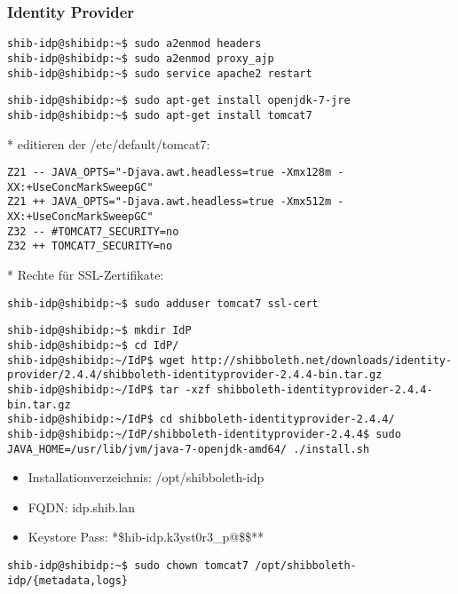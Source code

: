 \subsubsection{Identity Provider}
\begin{lstlisting}
shib-idp@shibidp:~$ sudo a2enmod headers
shib-idp@shibidp:~$ sudo a2enmod proxy_ajp
shib-idp@shibidp:~$ sudo service apache2 restart
\end{lstlisting}
\begin{lstlisting}
shib-idp@shibidp:~$ sudo apt-get install openjdk-7-jre
shib-idp@shibidp:~$ sudo apt-get install tomcat7
\end{lstlisting}
* editieren der /etc/default/tomcat7:
\begin{lstlisting}
Z21 -- JAVA_OPTS="-Djava.awt.headless=true -Xmx128m -XX:+UseConcMarkSweepGC"
Z21 ++ JAVA_OPTS="-Djava.awt.headless=true -Xmx512m -XX:+UseConcMarkSweepGC"
Z32 -- #TOMCAT7_SECURITY=no
Z32 ++ TOMCAT7_SECURITY=no
\end{lstlisting}
* Rechte für SSL-Zertifikate:
\begin{lstlisting}
shib-idp@shibidp:~$ sudo adduser tomcat7 ssl-cert
\end{lstlisting}
\begin{lstlisting}
shib-idp@shibidp:~$ mkdir IdP
shib-idp@shibidp:~$ cd IdP/
shib-idp@shibidp:~/IdP$ wget http://shibboleth.net/downloads/identity-provider/2.4.4/shibboleth-identityprovider-2.4.4-bin.tar.gz
shib-idp@shibidp:~/IdP$ tar -xzf shibboleth-identityprovider-2.4.4-bin.tar.gz
shib-idp@shibidp:~/IdP$ cd shibboleth-identityprovider-2.4.4/
shib-idp@shibidp:~/IdP/shibboleth-identityprovider-2.4.4$ sudo JAVA_HOME=/usr/lib/jvm/java-7-openjdk-amd64/ ./install.sh
\end{lstlisting}
\begin{itemize}
	\item Installationverzeichnis: /opt/shibboleth-idp
	\item FQDN: idp.shib.lan
	\item Keystore Pass: *\$hib-idp.k3yst0r3\_p@\$\$**
\end{itemize}
\begin{lstlisting}
shib-idp@shibidp:~$ sudo chown tomcat7 /opt/shibboleth-idp/{metadata,logs}
\end{lstlisting}
